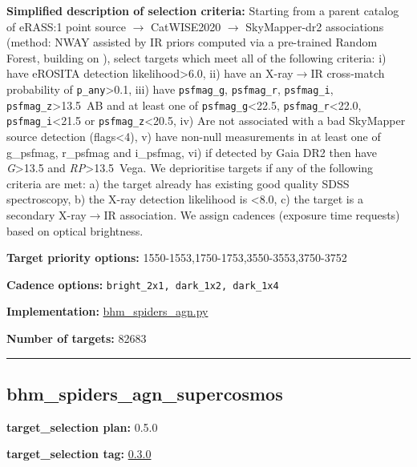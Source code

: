 \noindent\textbf{Simplified description of selection criteria:} Starting from a
parent catalog of eRASS:1 point source $\rightarrow$ CatWISE2020 $\rightarrow$ SkyMapper-dr2
associations (method: NWAY assisted by IR priors computed via a
pre-trained Random Forest, building on
\citealt{Salvato2022}), select targets which meet all of the following criteria:
i) have eROSITA detection likelihood\textgreater6.0, ii) have an
X-ray$\rightarrow$IR cross-match probability of \texttt{p\_any}\textgreater0.1, iii)
have \texttt{psfmag\_g}, \texttt{psfmag\_r}, \texttt{psfmag\_i},
\texttt{psfmag\_z}\textgreater13.5~AB and at least one of
\texttt{psfmag\_g}\textless22.5, \texttt{psfmag\_r}\textless22.0,
\texttt{psfmag\_i}\textless21.5 or \texttt{psfmag\_z}\textless20.5, iv)
Are not associated with a bad SkyMapper source detection
(flags\textless4), v) have non-null measurements in at least one of
g\_psfmag, r\_psfmag and i\_psfmag, vi) if detected by Gaia DR2 then
have \emph{G}\textgreater13.5 and \emph{RP}\textgreater13.5~Vega. We
deprioritise targets if any of the following criteria are met: a) the
target already has existing good quality SDSS spectroscopy, b) the X-ray
detection likelihood is \textless8.0, c) the target is a secondary
X-ray$\rightarrow$IR association. We assign cadences (exposure time requests) based
on optical brightness.


\noindent\textbf{Target priority options:}
1550-1553,1750-1753,3550-3553,3750-3752

\noindent\textbf{Cadence options:} \texttt{bright\_2x1,\ dark\_1x2,\ dark\_1x4}

\noindent\textbf{Implementation:}
\href{https://github.com/sdss/target_selection/blob/0.3.0/python/target_selection/cartons/bhm_spiders_agn.py}{bhm\_spiders\_agn.py}

\noindent\textbf{Number of targets:} 82683

\begin{center}\rule{0.5\linewidth}{0.5pt}\end{center}

\hypertarget{bhm_spiders_agn_supercosmos_plan0.5.0}{%
\subsection{bhm\_spiders\_agn\_supercosmos}\label{bhm_spiders_agn_supercosmos_plan0.5.0}}

\noindent\textbf{target\_selection plan:} 0.5.0

\noindent\textbf{target\_selection tag:}
\href{https://github.com/sdss/target_selection/tree/0.3.0/}{0.3.0}

